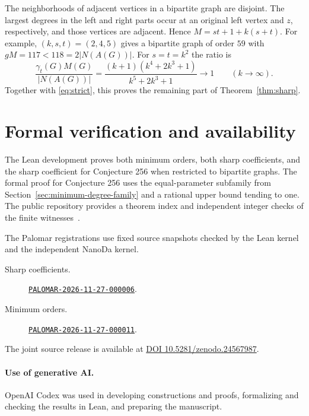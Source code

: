 \documentclass[11pt]{article}
\newcommand{\gt}{\gamma_t}
\newcommand{\archivebase}{https://github.com/PalomarArchive/burgerge--wowii255-total-domination--ccc373ad5fc0}
\begin{document}
The neighborhoods of adjacent vertices in a bipartite graph are
disjoint. The largest degrees in the left and right parts occur at
an original left vertex and \(z\), respectively, and those
vertices are adjacent. Hence \(M=st+1+k(s+t)\).
For example, \((k,s,t)=(2,4,5)\) gives a bipartite graph of order
\(59\) with \(gM=117<118=2|N(A(G))|\).
For \(s=t=k^2\) the ratio is
\[
 \frac{\gt(G)M(G)}{|N(A(G))|}
  =\frac{(k+1)(k^4+2k^3+1)}{k^5+2k^3+1}\longrightarrow 1
       \qquad(k\to\infty).
\]
Together with \eqref{eq:strict}, this proves the remaining part of
Theorem~\ref{thm:sharp}.

\section{Formal verification and availability}

The Lean development proves both minimum orders, both sharp
coefficients, and the sharp coefficient for Conjecture 256 when
restricted to bipartite graphs. The formal proof for Conjecture 256
uses the equal-parameter subfamily from
Section~\ref{sec:minimum-degree-family} and a rational upper bound
tending to one. The public repository provides a theorem index
and independent integer checks of the finite witnesses~\cite{code}.

The Palomar registrations use fixed source snapshots checked by the Lean
kernel and the independent NanoDa kernel.
\begin{description}
 \item[Sharp coefficients.]
 \href{\archivebase/tree/f1808b7d12e18b22b003b11acf0b3668f24d0bf4}{\texttt{PALOMAR-2026-11-27-000006}}.
 \item[Minimum orders.]
 \href{\archivebase/tree/fd8be52bd12973419e94c1a7471aa7dc508a9c3f}{\texttt{PALOMAR-2026-11-27-000011}}.
\end{description}
The joint source release is available at
\href{https://doi.org/10.5281/zenodo.24567987}{DOI 10.5281/zenodo.24567987}.

\paragraph{Use of generative AI.}
OpenAI Codex was used in developing constructions and proofs,
formalizing and checking the results in Lean, and preparing the manuscript.
\end{document}
